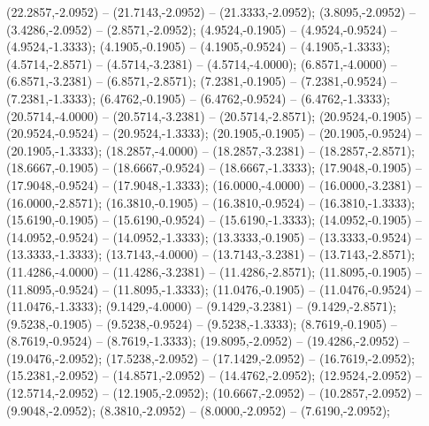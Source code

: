    (22.2857,-2.0952) -- (21.7143,-2.0952) -- (21.3333,-2.0952);
   (3.8095,-2.0952) -- (3.4286,-2.0952) -- (2.8571,-2.0952);
   (4.9524,-0.1905) -- (4.9524,-0.9524) -- (4.9524,-1.3333);
   (4.1905,-0.1905) -- (4.1905,-0.9524) -- (4.1905,-1.3333);
   (4.5714,-2.8571) -- (4.5714,-3.2381) -- (4.5714,-4.0000);
   (6.8571,-4.0000) -- (6.8571,-3.2381) -- (6.8571,-2.8571);
   (7.2381,-0.1905) -- (7.2381,-0.9524) -- (7.2381,-1.3333);
   (6.4762,-0.1905) -- (6.4762,-0.9524) -- (6.4762,-1.3333);
   (20.5714,-4.0000) -- (20.5714,-3.2381) -- (20.5714,-2.8571);
   (20.9524,-0.1905) -- (20.9524,-0.9524) -- (20.9524,-1.3333);
   (20.1905,-0.1905) -- (20.1905,-0.9524) -- (20.1905,-1.3333);
   (18.2857,-4.0000) -- (18.2857,-3.2381) -- (18.2857,-2.8571);
   (18.6667,-0.1905) -- (18.6667,-0.9524) -- (18.6667,-1.3333);
   (17.9048,-0.1905) -- (17.9048,-0.9524) -- (17.9048,-1.3333);
   (16.0000,-4.0000) -- (16.0000,-3.2381) -- (16.0000,-2.8571);
   (16.3810,-0.1905) -- (16.3810,-0.9524) -- (16.3810,-1.3333);
   (15.6190,-0.1905) -- (15.6190,-0.9524) -- (15.6190,-1.3333);
   (14.0952,-0.1905) -- (14.0952,-0.9524) -- (14.0952,-1.3333);
   (13.3333,-0.1905) -- (13.3333,-0.9524) -- (13.3333,-1.3333);
   (13.7143,-4.0000) -- (13.7143,-3.2381) -- (13.7143,-2.8571);
   (11.4286,-4.0000) -- (11.4286,-3.2381) -- (11.4286,-2.8571);
   (11.8095,-0.1905) -- (11.8095,-0.9524) -- (11.8095,-1.3333);
   (11.0476,-0.1905) -- (11.0476,-0.9524) -- (11.0476,-1.3333);
   (9.1429,-4.0000) -- (9.1429,-3.2381) -- (9.1429,-2.8571);
   (9.5238,-0.1905) -- (9.5238,-0.9524) -- (9.5238,-1.3333);
   (8.7619,-0.1905) -- (8.7619,-0.9524) -- (8.7619,-1.3333);
   (19.8095,-2.0952) -- (19.4286,-2.0952) -- (19.0476,-2.0952);
   (17.5238,-2.0952) -- (17.1429,-2.0952) -- (16.7619,-2.0952);
   (15.2381,-2.0952) -- (14.8571,-2.0952) -- (14.4762,-2.0952);
   (12.9524,-2.0952) -- (12.5714,-2.0952) -- (12.1905,-2.0952);
   (10.6667,-2.0952) -- (10.2857,-2.0952) -- (9.9048,-2.0952);
   (8.3810,-2.0952) -- (8.0000,-2.0952) -- (7.6190,-2.0952);
